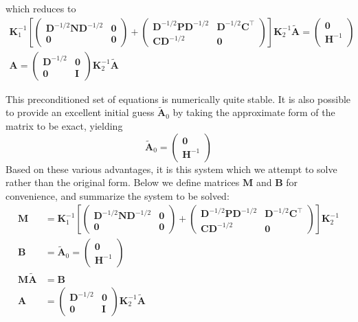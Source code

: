 which reduces to
\begin{gather}
\mathbf{K}_1^{-1} 
\left[
\begin{pmatrix}\mathbf{D}^{-1/2}\mathbf{ND}^{-1/2}&\mathbf{0}\\ \mathbf{0}&\mathbf{0}\end{pmatrix}
+
\begin{pmatrix}\mathbf{D}^{-1/2}\mathbf{PD}^{-1/2}&\mathbf{D}^{-1/2}\mathbf{C}^\top \\ \mathbf{CD}^{-1/2}&\mathbf{0}\end{pmatrix}
\right]
\mathbf{K}_2^{-1} \mathbf{\widetilde{A}} = 
\begin{pmatrix}\mathbf{0}\\ \mathbf{H}^{-1}\end{pmatrix}\\
\mathbf{A} = \begin{pmatrix}\mathbf{D}^{-1/2}&\mathbf{0}\\ \mathbf{0}&\mathbf{I}\end{pmatrix}\mathbf{K}_2^{-1}\mathbf{\widetilde{A}}
\end{gather}

This preconditioned set of equations is numerically quite stable.  It is also possible to provide an excellent initial guess $\mathbf{\widetilde{A}}_0$ by taking the approximate form of the matrix to be exact, yielding
\[
\mathbf{\widetilde{A}}_0 = \begin{pmatrix}\mathbf{0}\\ \mathbf{H}^{-1}\end{pmatrix}
\]
Based on these various advantages, it is this system which we attempt to solve rather than the original form.  Below we define matrices $\mathbf{M}$ and $\mathbf{B}$ for convenience, and summarize the system to be solved:
\begin{align}
\mathbf{M} &= \mathbf{K}_1^{-1} 
\left[
\begin{pmatrix}\mathbf{D}^{-1/2}\mathbf{ND}^{-1/2}&\mathbf{0}\\ \mathbf{0}&\mathbf{0}\end{pmatrix}
+
\begin{pmatrix}\mathbf{D}^{-1/2}\mathbf{PD}^{-1/2}&\mathbf{D}^{-1/2}\mathbf{C}^\top \\ \mathbf{CD}^{-1/2}&\mathbf{0}\end{pmatrix}
\right]
\mathbf{K}_2^{-1}\\
\mathbf{B} &= \mathbf{\widetilde{A}}_0 = \begin{pmatrix}\mathbf{0}\\ \mathbf{H}^{-1}\end{pmatrix}\\
\mathbf{M\widetilde{A}} &= \mathbf{B}\\
\mathbf{A} &= \begin{pmatrix}\mathbf{D}^{-1/2}&\mathbf{0}\\ \mathbf{0}&\mathbf{I}\end{pmatrix}\mathbf{K}_2^{-1}\mathbf{\widetilde{A}}
\end{align}


